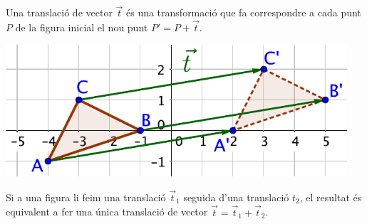 \begin{theorybox}
	
	 
 	\begin{minipage}{0.5\textwidth}
		Una translació de vector $\vec t$ és una transformació que fa correspondre a cada punt $P$ de la figura inicial el nou punt $P'=P+\vec t$.
	\end{minipage}
	\begin{minipage}{0.5\textwidth}
		\centering
	 
		\includegraphics[width=0.95\textwidth]{img-10/translacio}
	\end{minipage}
	
	Si a una figura li feim una translació $\vec t_1$ seguida d'una translació $t_2$, el resultat és equivalent a fer una única translació de vector $\vec t = \vec t_1 + \vec t_2$.
	
	
\end{theorybox}

